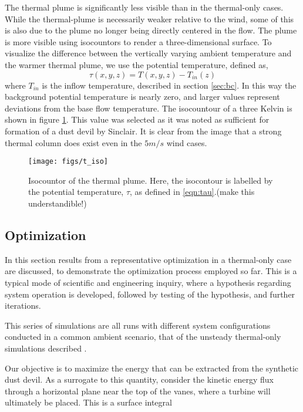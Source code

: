 The thermal plume is significantly less
visible than in the thermal-only cases. While the
thermal-plume is necessarily weaker relative to the wind, some of this
is also due to the plume no longer being directly centered in the
flow. The plume is more visible using isocountors to render a
three-dimensional surface. 
To visualize the difference between the vertically varying ambient temperature
and the warmer thermal plume, we use the potential temperature, defined
as, 
\begin{equation}
  \tau(x,y,z) = T(x,y,z) -T_{in}(z) 
   \label{eqn:tau}
\end{equation}
where $T_{in}$ is the inflow temperature, described
in section \ref{sec:bc}. In this way the background potential
temperature is nearly zero, and larger values represent deviations from
the base flow temperature. The isocountour of a three Kelvin is 
shown in figure \ref{fig:field_real}. This value was selected as
it was noted as sufficient for formation of a dust devil by
Sinclair\cite{Sinclair1969}. It is clear from the image that a 
strong thermal column does exist even in the $5 m/s$ wind cases. 

%
%
  \begin{figure}[!htb]
   \begin{center}
    \texttt{[image: figs/t\_iso]}
    \caption{Isocountor of the thermal plume. Here, the isocontour is
    labelled by the potential temperature, $\tau$, as defined in \ref{eqn:tau}.(make this understandible!)}
    \label{fig:field_real}
   \end{center}
  \end{figure}

\subsection{Optimization}

In this section results from a representative optimization
in a thermal-only case are discussed, to demonstrate the optimization 
process employed so far. This is a typical mode of scientific and
engineering inquiry, where a hypothesis regarding system operation is
developed, followed by testing of the hypothesis, and further
iterations.  

This series of simulations are all runs with different system
configurations conducted in a common ambient scenario, that of the
unsteady thermal-only simulations described . 

Our objective is to maximize the energy that can be 
extracted from the synthetic dust devil. As a surrogate to this
quantity, consider the kinetic energy flux through a horizontal plane
near the top of the vanes, where a turbine will ultimately be
placed. This is a surface integral\cite{landau1959fm}

